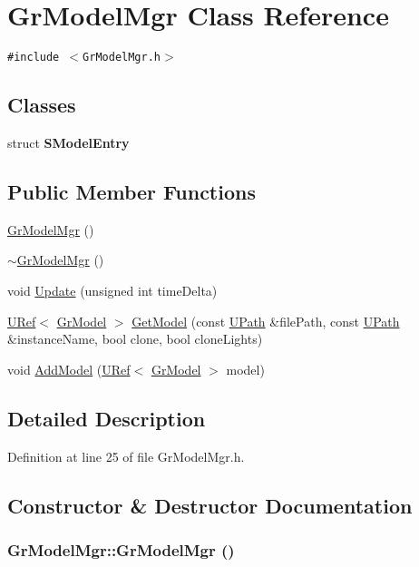 \hypertarget{class_gr_model_mgr}{
\section{GrModelMgr Class Reference}
\label{class_gr_model_mgr}
}
{\tt \#include $<$GrModelMgr.h$>$}

\subsection*{Classes}
\begin{CompactItemize}
\item 
struct \textbf{SModelEntry}
\end{CompactItemize}
\subsection*{Public Member Functions}
\begin{CompactItemize}
\item 
\hyperlink{class_gr_model_mgr_11090621062f53e7a1828cf35d40a58b}{GrModelMgr} ()
\item 
\hyperlink{class_gr_model_mgr_c40806807494901c46fc78ec613398ab}{$\sim$GrModelMgr} ()
\item 
void \hyperlink{class_gr_model_mgr_29ca7717cbbd93e5026c4714e6e36e9f}{Update} (unsigned int timeDelta)
\item 
\hyperlink{class_u_ref}{URef}$<$ \hyperlink{class_gr_model}{GrModel} $>$ \hyperlink{class_gr_model_mgr_1d0072cee000d7eb33cf894f801cb83f}{GetModel} (const \hyperlink{class_u_path}{UPath} \&filePath, const \hyperlink{class_u_path}{UPath} \&instanceName, bool clone, bool cloneLights)
\item 
void \hyperlink{class_gr_model_mgr_17714eeebe02b7db342aa4d28efbc4d9}{AddModel} (\hyperlink{class_u_ref}{URef}$<$ \hyperlink{class_gr_model}{GrModel} $>$ model)
\end{CompactItemize}


\subsection{Detailed Description}


Definition at line 25 of file GrModelMgr.h.

\subsection{Constructor \& Destructor Documentation}
\hypertarget{class_gr_model_mgr_11090621062f53e7a1828cf35d40a58b}{
\subsubsection[{GrModelMgr}]{\setlength{\rightskip}{0pt plus 5cm}GrModelMgr::GrModelMgr ()}}
\label{class_gr_model_mgr_11090621062f53e7a1828cf35d40a58b}




